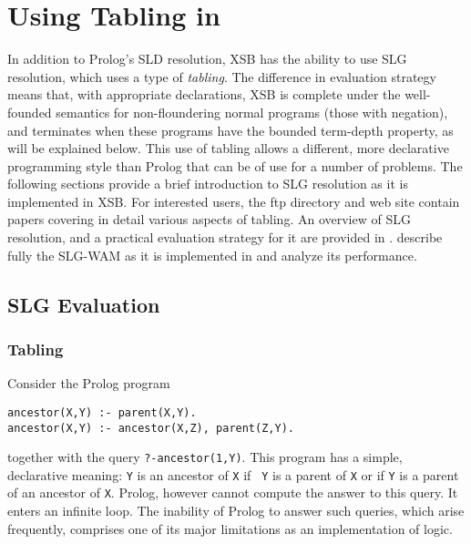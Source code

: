 \chapter{Using Tabling in \ourprolog} \label{tabling_overview}
In addition to Prolog's SLD resolution, XSB has the ability to use SLG
resolution, which uses a type of {\em tabling}.  The difference in
evaluation strategy means that, with appropriate declarations, XSB is
complete under the well-founded semantics \cite{VGRS91} for
non-floundering normal programs (those with negation), and terminates
when these programs have the bounded term-depth property, as will be
explained below.  This use of tabling allows a different, more
declarative programming style than Prolog that can be of use for a
number of problems.  The following sections provide a brief
introduction to SLG resolution as it is implemented in XSB.  For
interested users, the ftp directory and web site contain papers
covering in detail various aspects of tabling.  An overview of SLG
resolution, and a practical evaluation strategy for it are provided in
\cite{ChWa96,SaSW95a,FSW98}. \cite{SaSw98,RRSSW98,JFLP-Scheduling,ChSW95}
describe fully the SLG-WAM as it is implemented in \version and
analyze its performance.

\section{SLG Evaluation}

\subsection{Tabling}	
Consider the Prolog program
\begin{center}
\begin{minipage}{3.8in}
\begin{verbatim}
ancestor(X,Y) :- parent(X,Y).
ancestor(X,Y) :- ancestor(X,Z), parent(Z,Y).
\end{verbatim}						       
\end{minipage}
\end{center}
together with the query {\tt ?-ancestor(1,Y)}.  This program has a
simple, declarative meaning: {\tt Y} is an ancestor of {\tt X} if {\tt
Y} is a parent of {\tt X} or if {\tt Y} is a parent of an ancestor of
{\tt X}.  Prolog, however cannot compute the answer to this query.  It
enters an infinite loop.  The inability of Prolog to answer such
queries, which arise frequently, comprises one of its major
limitations as an implementation of logic.

